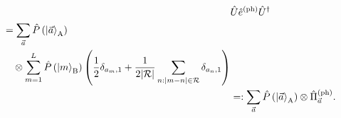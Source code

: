 \documentclass[twocolumn,superscriptaddress,pra,footinbib,notitlepage]{revtex4-1}
\newcommand{\1}{\mbox{1}\hspace{-0.25em}\mbox{l}}
\newcommand{\abs}[1]{\lvert#1\rvert}
\begin{document}
\begin{align}
&\hat{U}\hat{e}^{(\textrm{ph})}\hat{U}^\dagger\nonumber\\%
\begin{split}
&=\sum_{\vec{a}}\hat{P}\left(\ket{\vec{a}}_\textrm{A}\right)\\
&\quad\otimes\sum_{m=1}^L\hat{P}\left(\ket{m}_\textrm{B}\right)\left(\frac{1}{2}\delta_{a_m, 1}+\frac{1}{2\abs{\mathcal{R}}}\sum_{n:\abs{m-n}\in\mathcal{R}}\delta_{a_n, 1}\right)
\end{split}\nonumber\\
&=:\sum_{\vec{a}}\hat{P}\left(\ket{\vec{a}}_\textrm{A}\right)\otimes\hat{\Pi}_{\vec{a}}^{(\textrm{ph})}.\label{eq:unitary-eph}
\end{align}
\end{document}
